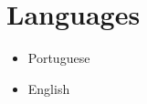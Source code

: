 \documentclass[a4paper]{simplecv}
\begin{document}
\section{Languages}

\begin{multicols}{3}
	\raggedcolumns
	\begin{itemize}
		\item Portuguese
		\item English
	\end{itemize}
\end{multicols}

%
\end{document}
